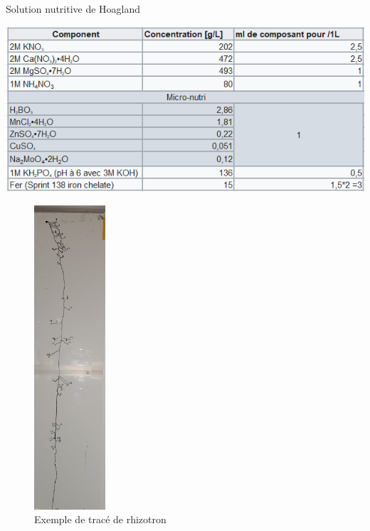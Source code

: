 \newpage

\label{an:Hoagland}
\begin{table}[ht]
\centering
\caption{Solution nutritive de Hoagland}
\includegraphics[width=1\textwidth]{Image/hoagland.png}
\end{table}

\newpage

\label{an:trace}
\begin{figure}[ht]
\centering
\includegraphics[width=0.235\textwidth]{Image/trace.png}
\caption{Exemple de tracé de rhizotron}
\end{figure}

\newpage

